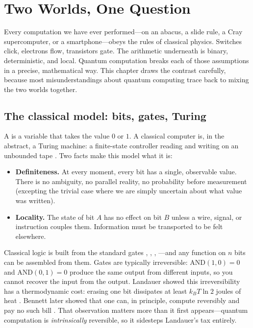 \chapter{Two Worlds, One Question}


Every computation we have ever performed---on an abacus, a slide rule, a Cray supercomputer, or a smartphone---obeys the rules of classical physics. Switches click, electrons flow, transistors gate. The arithmetic underneath is binary, deterministic, and local. Quantum computation breaks each of those assumptions in a precise, mathematical way. This chapter draws the contrast carefully, because most misunderstandings about quantum computing trace back to mixing the two worlds together.

\section{The classical model: bits, gates, Turing}

A  is a variable that takes the value $0$ or $1$. A classical computer is, in the abstract, a Turing machine: a finite-state controller reading and writing on an unbounded tape \citep{shannon_mathematical_1948}. Two facts make this model what it is:

\begin{itemize}
  \item \textbf{Definiteness.} At every moment, every bit has a single, observable value. There is no ambiguity, no parallel reality, no probability before measurement (excepting the trivial case where we are simply uncertain about what value was written).
  \item \textbf{Locality.} The state of bit $A$ has no effect on bit $B$ unless a wire, signal, or instruction couples them. Information must be transported to be felt elsewhere.
\end{itemize}

Classical logic is built from the standard gates , , , ---and any function on $n$ bits can be assembled from them. Gates are typically irreversible: $\mathrm{AND}(1,0)=0$ and $\mathrm{AND}(0,1)=0$ produce the same output from different inputs, so you cannot recover the input from the output. Landauer showed this irreversibility has a thermodynamic cost: erasing one bit dissipates at least $k_B T\ln 2$ joules of heat \citep{landauer_irreversibility_1961}. Bennett later showed that one can, in principle, compute reversibly and pay no such bill \citep{bennett_logical_1973}. That observation matters more than it first appears---quantum computation is \emph{intrinsically} reversible, so it sidesteps Landauer's tax entirely.

